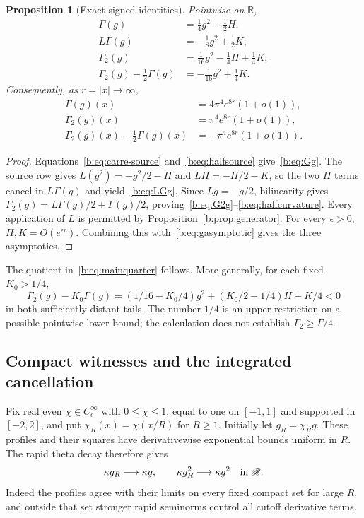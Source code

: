 \documentclass[11pt,a4paper]{article}
\numberwithin{equation}{section}
\newtheorem{proposition}[theorem]{Proposition}
\theoremstyle{definition}\newtheorem{definition}[theorem]{Definition}
\theoremstyle{remark}\newtheorem{remark}[theorem]{Remark}
\newcommand{\R}{\mathbb R}\newcommand{\C}{\mathbb C}\newcommand{\N}{\mathbb N}
\newcommand{\RR}{\mathscr R}\newcommand{\SSS}{\mathcal S_{\!\exp}}\newcommand{\CE}{\mathcal C_{\exp}}
\begin{document}
\begin{proposition}[Exact signed identities]\label{b:prop:quarteridentities}
Pointwise on $\R$,
\begin{align}
 \Gamma(g)&=\tfrac14g^2-\tfrac12H,\label{b:eq:Gg}\\
 L\Gamma(g)&=-\tfrac18g^2+\tfrac12K,\label{b:eq:LGg}\\
 \Gamma_2(g)&=\tfrac1{16}g^2-\tfrac14H+\tfrac14K,\label{b:eq:G2g}\\
 \Gamma_2(g)-\tfrac12\Gamma(g)&=-\tfrac1{16}g^2+\tfrac14K.\label{b:eq:halfcurvature}
\end{align}
Consequently, as $r=|x|\to\infty$,
\begin{align}
 \Gamma(g)(x)&=4\pi^4e^{8r}(1+o(1)),\label{b:eq:Gtail}\\
 \Gamma_2(g)(x)&=\pi^4e^{8r}(1+o(1)),\label{b:eq:G2tail}\\
 \Gamma_2(g)(x)-\tfrac12\Gamma(g)(x)&=-\pi^4e^{8r}(1+o(1)).\label{b:eq:deftail}
\end{align}
\end{proposition}
\begin{proof}
Equations~\eqref{b:eq:carre-source} and~\eqref{b:eq:halfsource} give~\eqref{b:eq:Gg}. The source row gives $L(g^2)=-g^2/2-H$ and $LH=-H/2-K$, so the two $H$ terms cancel in $L\Gamma(g)$ and yield~\eqref{b:eq:LGg}. Since $Lg=-g/2$, bilinearity gives
$\Gamma_2(g)=L\Gamma(g)/2+\Gamma(g)/2$, proving~\eqref{b:eq:G2g}--\eqref{b:eq:halfcurvature}. Every application of $L$ is permitted by Proposition~\ref{b:prop:generator}. For every $\epsilon>0$, $H,K=O(e^{\epsilon r})$. Combining this with~\eqref{b:eq:gasymptotic} gives the three asymptotics.
\end{proof}

The quotient in~\eqref{b:eq:mainquarter} follows. More generally, for each fixed $K_0>1/4$,
\begin{equation}\label{b:eq:anycurvature}
 \Gamma_2(g)-K_0\Gamma(g)
  =(1/16-K_0/4)g^2+(K_0/2-1/4)H+K/4<0
\end{equation}
in both sufficiently distant tails. The number $1/4$ is an upper restriction on a possible pointwise lower bound; the calculation does not establish $\Gamma_2\ge\Gamma/4$.

\subsection{Compact witnesses and the integrated cancellation}\label{b:sec:cutoffs}

Fix real even $\chi\in C_c^\infty$ with $0\le\chi\le1$, equal to one on $[-1,1]$ and supported in $[-2,2]$, and put $\chi_R(x)=\chi(x/R)$ for $R\ge1$. Initially let $g_R=\chi_Rg$. These profiles and their squares have derivativewise exponential bounds uniform in $R$. The rapid theta decay therefore gives
\begin{equation}\label{b:eq:rapidcutoffs}
 \kappa g_R\longrightarrow\kappa g,\qquad
 \kappa g_R^2\longrightarrow\kappa g^2
 \quad\hbox{in }\RR.
\end{equation}
Indeed the profiles agree with their limits on every fixed compact set for large $R$, and outside that set stronger rapid seminorms control all cutoff derivative terms.
\end{document}
